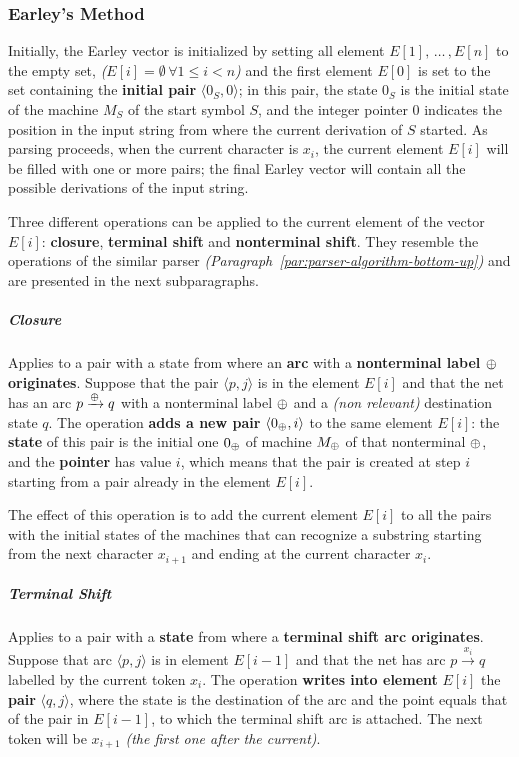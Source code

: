 \documentclass[english]{article}
\begin{document}
\subsubsection{Earley's Method}

Initially, the Earley vector is initialized by setting all element \(E[1],\,\ldots\,, E[n]\) to the empty set, \textit{(\(E[i] = \emptyset \, \forall 1 \leq i < n\))} and the first element \(E[0]\) is set to the set containing the \textbf{initial pair} \(\langle 0_S, 0 \rangle\);
in this pair, the state \(0_S\) is the initial state of the machine \(M_S\) of the start symbol \(S\), and the integer pointer \(0\) indicates the position in the input string from where the current derivation of \(S\) started.
As parsing proceeds, when the current character is \(x_i\), the current element \(E[i]\) will be filled with one or more pairs;
the final Earley vector will contain all the possible derivations of the input string.

Three different operations can be applied to the current element of the vector \(E[i]\):
\textbf{closure}, \textbf{terminal shift} and \textbf{nonterminal shift}.
They resemble the operations of the similar \elro parser \textit{(Paragraph~\ref{par:parser-algorithm-bottom-up})} and are presented in the next subparagraphs.

\subparagraph*{Closure}
Applies to a pair with a state from where an \textbf{arc} with a \textbf{nonterminal label \(\oplus\) originates}.
Suppose that the pair \(\langle p, j \rangle\) is in the element \(E[i]\) and that the net has an arc \(p \xrightarrow{\oplus} q\) with a nonterminal label \(\oplus\) and a \textit{(non relevant)} destination state \(q\).
The operation \textbf{adds a new pair} \(\langle 0_\oplus, i \rangle\) to the same element \(E[i]\):
the \textbf{state} of this pair is the initial one \(0_\oplus\) of machine \(M_\oplus\) of that nonterminal \(\oplus\), and the \textbf{pointer} has value \(i\), which means that the pair is created at step \(i\) starting from a pair already in the element \(E[i]\).

The effect of this operation is to add the current element \(E[i]\) to all the pairs with the initial states of the machines that can recognize a substring starting from the next character \(x_{i+1}\) and ending at the current character \(x_i\).

\subparagraph*{Terminal Shift}
Applies to a pair with a \textbf{state} from where a \textbf{terminal shift arc originates}.
Suppose that arc \(\langle p, j \rangle\) is in element \(E[i-1]\) and that the net has arc \(p \xrightarrow{x_i} q\) labelled by the current token \(x_i\).
The operation \textbf{writes into element} \(E[i]\) the \textbf{pair} \(\langle q, j \rangle\), where the state is the destination of the arc and the point equals that of the pair in \(E[i-1]\), to which the terminal shift arc is attached.
The next token will be \(x_{i+1}\) \textit{(the first one after the current)}.
\end{document}
